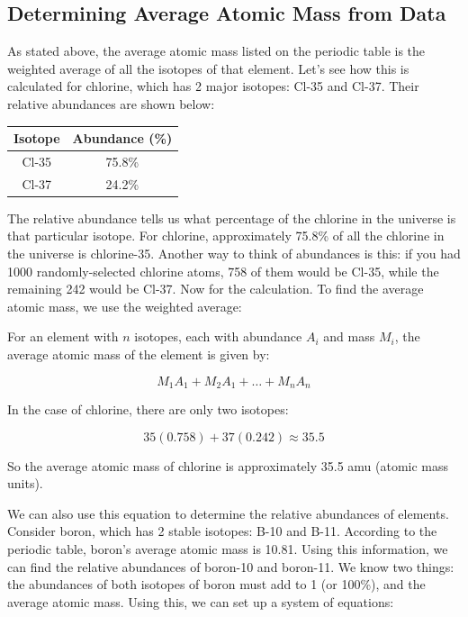 \subsection{Determining Average Atomic Mass from Data}
As stated above, the average atomic mass listed on the periodic table is the 
weighted average of all the isotopes of that element. Let's see how this is 
calculated for chlorine, which has 2 major isotopes: Cl-35 and Cl-37. Their 
relative abundances are shown below:

\begin{center}
\begin{tabular}{|c|c|}
\hline
Isotope & Abundance (\%)\\
\hline
Cl-35 & 75.8\%\\
\hline
Cl-37 & 24.2\%\\
\hline 
\end{tabular}
\end{center}

The relative abundance tells us what percentage of the chlorine in the universe 
is that particular isotope. For chlorine, approximately 75.8\% of all the 
chlorine in the universe is chlorine-35. Another way to think of abundances is 
this: if you had 1000 randomly-selected chlorine atoms, 758 of them would be 
Cl-35, while the remaining 242 would be Cl-37. Now for the calculation. To 
find the average atomic mass, we use the weighted average:

\begin{mdframed}[style = important, frametitle = {Calculating Average Atomic Mass}]
For an element with $n$ isotopes, each with abundance $A_i$ and mass $M_i$, the 
average atomic mass of the element is given by:

$$M_1 A_1 + M_2 A_1 + \dots +M_n A_n$$
\end{mdframed}

In the case of chlorine, there are only two isotopes:

$$35 \left(0.758\right) + 37 \left(0.242 \right) \approx 35.5$$

So the average atomic mass of chlorine is approximately 35.5 amu (atomic mass 
units). 

We can also use this equation to determine the relative abundances of elements. 
Consider boron, which has 2 stable isotopes: B-10 and B-11. According to the 
periodic table, boron's average atomic mass is 10.81. Using this information, 
we can find the relative abundances of boron-10 and boron-11. We know two 
things: the abundances of both isotopes of boron must add to 1 (or 100\%), and 
the average atomic mass. Using this, we can set up a system of equations:

